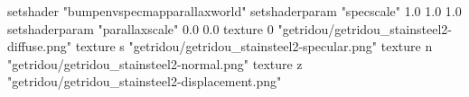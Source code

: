 setshader "bumpenvspecmapparallaxworld"
setshaderparam "specscale" 1.0 1.0 1.0
setshaderparam "parallaxscale" 0.0 0.0
texture 0 "getridou/getridou_stainsteel2-diffuse.png"
texture s "getridou/getridou_stainsteel2-specular.png"
texture n "getridou/getridou_stainsteel2-normal.png"
texture z "getridou/getridou_stainsteel2-displacement.png"
